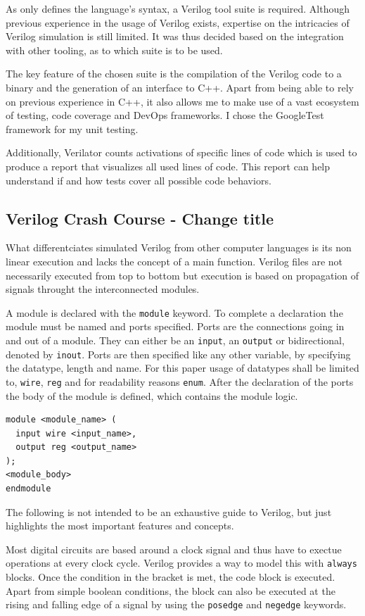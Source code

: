 As \cite{10458102} only defines the language's syntax, a Verilog tool suite is required. Although previous experience in the usage of Verilog exists, expertise on the intricacies of Verilog simulation is still limited. It was thus decided based on the integration with other tooling, as to which suite is to be used. 

The key feature of the chosen suite is the compilation of the Verilog code to a binary and the generation of an interface to C++. Apart from being able to rely on previous experience in C++, it also allows me to make use of a vast ecosystem of testing, code coverage and DevOps frameworks. I chose the GoogleTest framework for my unit testing. 

Additionally, Verilator counts activations of specific lines of code which is used to produce a report that visualizes all used lines of code. This report can help understand if and how tests cover all possible code behaviors. 

\subsection{Verilog Crash Course - Change title}
What differentciates simulated Verilog from other computer languages is its non linear execution and lacks the concept of a main function. Verilog files are not necessarily executed from top to bottom but execution is based on propagation of signals throught the interconnected modules. 

A module is declared with the \texttt{module} keyword. To complete a declaration the module must be named and ports specified. Ports are the connections going in and out of a module. They can either be an \texttt{input}, an \texttt{output} or bidirectional, denoted by \texttt{inout}. Ports are then specified like any other variable, by specifying the datatype, length and name. For this paper usage of datatypes shall be limited to, \texttt{wire}, \texttt{reg} and for readability reasons \texttt{enum}. After the declaration of the ports the body of the module is defined, which contains the module logic.
\begin{lstlisting}
module <module_name> (
  input wire <input_name>,
  output reg <output_name>
);
<module_body>
endmodule
\end{lstlisting}

The following is not intended to be an exhaustive guide to Verilog, but just highlights the most important features and concepts. 

Most digital circuits are based around a clock signal and thus have to exectue operations at every clock cycle. Verilog provides a way to model this with \texttt{always} blocks. Once the condition in the bracket is met, the code block is executed. Apart from simple boolean conditions, the block can also be executed at the rising and falling edge of a signal by using the \texttt{posedge} and \texttt{negedge} keywords.

